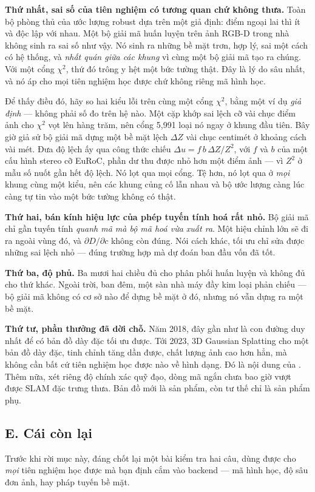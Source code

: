 \documentclass[../../deep_learning.tex]{subfiles}
\begin{document}
\textbf{Thứ nhất, sai số của tiên nghiệm có tương quan chứ không thưa.} Toàn bộ phòng thủ của ước lượng robust dựa trên một giả định: điểm ngoại lai thì ít và độc lập với nhau. Một bộ giải mã huấn luyện trên ảnh RGB-D trong nhà không sinh ra sai số như vậy. Nó sinh ra những bề mặt trơn, hợp lý, sai một cách có hệ thống, và \emph{nhất quán giữa các khung} vì cùng một bộ giải mã tạo ra chúng. Với một cổng \(\chi^2\), thứ đó trông y hệt một bức tường thật. Đây là lý do sâu nhất, và nó áp cho mọi tiên nghiệm học được chứ không riêng mã hình học.

Để thấy điều đó, hãy so hai kiểu lỗi trên cùng một cổng \(\chi^2\), bằng một ví dụ \emph{giả định} --- không phải số đo trên hệ nào. Một cặp khớp sai lệch cỡ vài chục điểm ảnh cho \(\chi^2\) vọt lên hàng trăm, nên cổng 5,991 loại nó ngay ở khung đầu tiên. Bây giờ giả sử bộ giải mã dựng một bề mặt lệch \(\Delta Z\) vài chục centimét ở khoảng cách vài mét. Đưa độ lệch ấy qua công thức chiếu \(\Delta u = f\,b\,\Delta Z/Z^2\), với \(f\) và \(b\) của một cấu hình stereo cỡ EuRoC, phần dư thu được nhỏ hơn một điểm ảnh --- vì \(Z^2\) ở mẫu số nuốt gần hết độ lệch. Nó lọt qua mọi cổng. Tệ hơn, nó lọt qua ở \emph{mọi} khung cùng một kiểu, nên các khung củng cố lẫn nhau và bộ ước lượng càng lúc càng tự tin vào một bức tường không có thật.

\textbf{Thứ hai, bán kính hiệu lực của phép tuyến tính hoá rất nhỏ.} Bộ giải mã chỉ gần tuyến tính \emph{quanh mã mà bộ mã hoá vừa xuất ra}. Một hiệu chỉnh lớn sẽ đi ra ngoài vùng đó, và \(\partial D/\partial c\) không còn đúng. Nói cách khác, tối ưu chỉ sửa được những sai lệch nhỏ --- đúng trường hợp mà dự đoán ban đầu vốn đã tốt.

\textbf{Thứ ba, độ phủ.} Ba mươi hai chiều đủ cho phân phối huấn luyện và không đủ cho thứ khác. Ngoài trời, ban đêm, một sàn nhà máy đầy kim loại phản chiếu --- bộ giải mã không có cơ sở nào để dựng bề mặt ở đó, nhưng nó vẫn dựng ra một bề mặt.

\textbf{Thứ tư, phần thưởng đã dời chỗ.} Năm 2018, đây gần như là con đường duy nhất để có bản đồ dày đặc tối ưu được. Tới 2023, 3D Gaussian Splatting \cite{kerbl20233dgs} cho một bản đồ dày đặc, tinh chỉnh tăng dần được, chất lượng ảnh cao hơn hẳn, mà không cần bất cứ tiên nghiệm học được nào về hình dạng. Đó là nội dung của . Thêm nữa, xét riêng độ chính xác quỹ đạo, dòng mã ngắn chưa bao giờ vượt được SLAM đặc trưng thưa. Bản đồ mới là sản phẩm, còn tư thế chỉ là sản phẩm phụ.

\subsection{E. Cái còn lại}
Trước khi rời mục này, đáng chốt lại một bài kiểm tra hai câu, dùng được cho \emph{mọi} tiên nghiệm học được mà bạn định cắm vào backend --- mã hình học, độ sâu đơn ảnh, hay pháp tuyến bề mặt.
\end{document}
